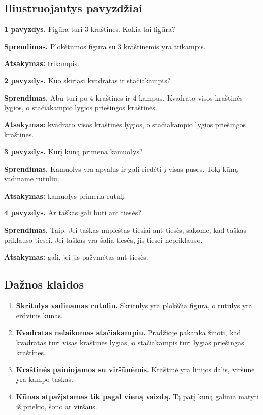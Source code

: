 \subsection{Iliustruojantys pavyzdžiai}

\textbf{1 pavyzdys.} Figūra turi \(3\) kraštines. Kokia tai figūra?

\textbf{Sprendimas.} Plokštumos figūra su \(3\) kraštinėmis yra trikampis.

\textbf{Atsakymas:} trikampis.

\textbf{2 pavyzdys.} Kuo skiriasi kvadratas ir stačiakampis?

\textbf{Sprendimas.} Abu turi po \(4\) kraštines ir \(4\) kampus. Kvadrato visos kraštinės lygios, o stačiakampio lygios priešingos kraštinės.

\textbf{Atsakymas:} kvadrato visos kraštinės lygios, o stačiakampio lygios priešingos kraštinės.

\textbf{3 pavyzdys.} Kurį kūną primena kamuolys?

\textbf{Sprendimas.} Kamuolys yra apvalus ir gali riedėti į visas puses. Tokį kūną vadiname rutuliu.

\textbf{Atsakymas:} kamuolys primena rutulį.

\textbf{4 pavyzdys.} Ar taškas gali būti ant tiesės?

\textbf{Sprendimas.} Taip. Jei taškas nupieštas tiesiai ant tiesės, sakome, kad taškas priklauso tiesei. Jei taškas yra šalia tiesės, jis tiesei nepriklauso.

\textbf{Atsakymas:} gali, jei jis pažymėtas ant tiesės.

\subsection{Dažnos klaidos}

\begin{enumerate}
\item \textbf{Skritulys vadinamas rutuliu.} Skritulys yra plokščia figūra, o rutulys yra erdvinis kūnas.
\item \textbf{Kvadratas nelaikomas stačiakampiu.} Pradžioje pakanka žinoti, kad kvadratas turi visas kraštines lygias, o stačiakampis turi lygias priešingas kraštines.
\item \textbf{Kraštinės painiojamos su viršūnėmis.} Kraštinė yra linijos dalis, viršūnė yra kampo taškas.
\item \textbf{Kūnas atpažįstamas tik pagal vieną vaizdą.} Tą patį kūną galima matyti iš priekio, šono ar viršaus.
\end{enumerate}

